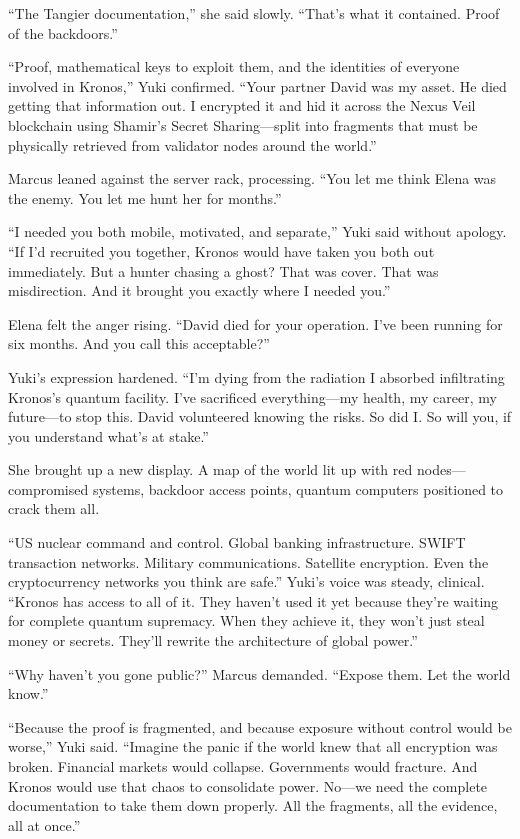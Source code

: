 ``The Tangier documentation,'' she said slowly. ``That's what it contained. Proof of the backdoors.''

``Proof, mathematical keys to exploit them, and the identities of everyone involved in Kronos,'' Yuki confirmed. ``Your partner David was my asset. He died getting that information out. I encrypted it and hid it across the Nexus Veil blockchain using Shamir's Secret Sharing---split into fragments that must be physically retrieved from validator nodes around the world.''

Marcus leaned against the server rack, processing. ``You let me think Elena was the enemy. You let me hunt her for months.''

``I needed you both mobile, motivated, and separate,'' Yuki said without apology. ``If I'd recruited you together, Kronos would have taken you both out immediately. But a hunter chasing a ghost? That was cover. That was misdirection. And it brought you exactly where I needed you.''

Elena felt the anger rising. ``David died for your operation. I've been running for six months. And you call this acceptable?''

Yuki's expression hardened. ``I'm dying from the radiation I absorbed infiltrating Kronos's quantum facility. I've sacrificed everything---my health, my career, my future---to stop this. David volunteered knowing the risks. So did I. So will you, if you understand what's at stake.''

She brought up a new display. A map of the world lit up with red nodes---compromised systems, backdoor access points, quantum computers positioned to crack them all.

``US nuclear command and control. Global banking infrastructure. SWIFT transaction networks. Military communications. Satellite encryption. Even the cryptocurrency networks you think are safe.'' Yuki's voice was steady, clinical. ``Kronos has access to all of it. They haven't used it yet because they're waiting for complete quantum supremacy. When they achieve it, they won't just steal money or secrets. They'll rewrite the architecture of global power.''

``Why haven't you gone public?'' Marcus demanded. ``Expose them. Let the world know.''

``Because the proof is fragmented, and because exposure without control would be worse,'' Yuki said. ``Imagine the panic if the world knew that all encryption was broken. Financial markets would collapse. Governments would fracture. And Kronos would use that chaos to consolidate power. No---we need the complete documentation to take them down properly. All the fragments, all the evidence, all at once.''

